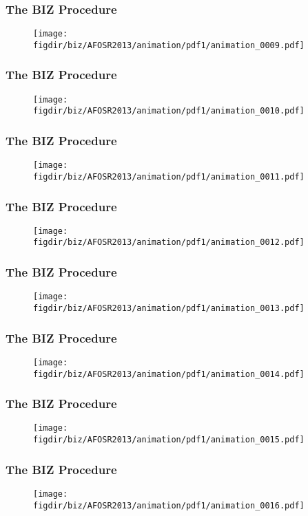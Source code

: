 \documentclass[13pt]{beamer}
\newcommand{\figdir}{../../fig}
\begin{document}
\begin{frame}\frametitle{The BIZ Procedure}\begin{figure}\texttt{[image: \\figdir/biz/AFOSR2013/animation/pdf1/animation\_0009.pdf]}\end{figure}\end{frame}
\begin{frame}\frametitle{The BIZ Procedure}\begin{figure}\texttt{[image: \\figdir/biz/AFOSR2013/animation/pdf1/animation\_0010.pdf]}\end{figure}\end{frame}
\begin{frame}\frametitle{The BIZ Procedure}\begin{figure}\texttt{[image: \\figdir/biz/AFOSR2013/animation/pdf1/animation\_0011.pdf]}\end{figure}\end{frame}
\begin{frame}\frametitle{The BIZ Procedure}\begin{figure}\texttt{[image: \\figdir/biz/AFOSR2013/animation/pdf1/animation\_0012.pdf]}\end{figure}\end{frame}
\begin{frame}\frametitle{The BIZ Procedure}\begin{figure}\texttt{[image: \\figdir/biz/AFOSR2013/animation/pdf1/animation\_0013.pdf]}\end{figure}\end{frame}
\begin{frame}\frametitle{The BIZ Procedure}\begin{figure}\texttt{[image: \\figdir/biz/AFOSR2013/animation/pdf1/animation\_0014.pdf]}\end{figure}\end{frame}
\begin{frame}\frametitle{The BIZ Procedure}\begin{figure}\texttt{[image: \\figdir/biz/AFOSR2013/animation/pdf1/animation\_0015.pdf]}\end{figure}\end{frame}
\begin{frame}\frametitle{The BIZ Procedure}\begin{figure}\texttt{[image: \\figdir/biz/AFOSR2013/animation/pdf1/animation\_0016.pdf]}\end{figure}\end{frame}
\end{document}
